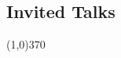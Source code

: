 \documentclass[10pt]{article}
\newenvironment{myindentpar}[1]%
{\begin{list}{}%
         {\setlength{\leftmargin}{#1}}%
         \item[]%
}
{\end{list}}
\newcounter{list}
\begin{document}
\begin{myindentpar}{0.00cm}
\begin{enumerate}[leftmargin=.5cm]
\end{enumerate}







\end{myindentpar}

\subsection{\sc Invited Talks}
\vspace{-0.4cm} \line(1,0){370} \vspace{-0.1cm}
\end{document}
